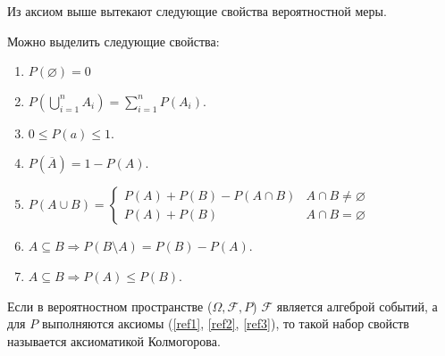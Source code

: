 Из аксиом выше вытекают следующие свойства вероятностной меры.
\begin{theorem}
    Можно выделить следующие свойства:
    \begin{enumerate}
        \item $P(\varnothing) = 0$ 
        \item $ P(\bigcup\limits_{i = 1}^n A_i) = \sum\limits_{i = 1}^n P(A_i)$.
        \item $0 \le P(a) \le 1$.
        \item $P(\overline{A}) = 1 - P(A)$.
        \item $P(A \cup B) = \begin{cases}
        P(A) + P(B) - P(A \cap B) & A \cap B \neq \varnothing \\
        P(A) + P(B)& A \cap B = \varnothing
        \end{cases}$
        \item $A \subseteq B \Rightarrow P(B \setminus A) = P(B) - P(A)$.
        \item $A \subseteq B \Rightarrow P(A) \le P(B)$. 
    \end{enumerate}
\end{theorem}

\begin{definition}
    Если в вероятностном пространстве ($\Omega, \mathcal{F}, P$) 
    $\mathcal{F}$ является алгеброй событий, а для $P$ выполняются аксиомы
    (\ref{ref1}, \ref{ref2}, \ref{ref3}), то такой набор свойств называется
    аксиоматикой Колмогорова.
\end{definition}

